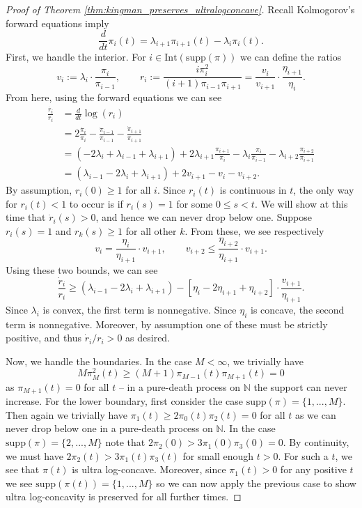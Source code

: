 \documentclass[10pt,oneside,reqno]{article}
\theoremstyle{plain}
\theoremstyle{definition}
\numberwithin{equation}{section}
\renewcommand{\leq}{\leqslant}
\renewcommand{\geq}{\geqslant}
\newcommand{\N}{\mathbb{N}}
\begin{document}
\begin{proof}[Proof of Theorem \ref{thm:kingman_preserves_ultralogconcave}]
     Recall Kolmogorov's forward equations imply
    \[\frac{d}{dt} \pi_i(t) = \lambda_{i+1}\pi_{i+1}(t) - \lambda_i \pi_i(t).\]
    \noindent First, we handle the interior. For $i \in \mathrm{Int}(\mathrm{supp}(\pi))$ we can define the ratios
    \[v_i := \lambda_i \cdot \frac{\pi_i}{\pi_{i-1}}, \qquad r_i := \frac{i\pi_i^2}{(i+1)\pi_{i-1}\pi_{i+1}}  = \frac{v_i}{v_{i+1}} \cdot \frac{\eta_{i+1}}{\eta_i}.\]
    \noindent From here, using the forward equations we can see
    \begin{align*}
        \frac{\dot{r_i}}{r_i} & = \frac{d}{dt} \log(r_i)\\
        & = 2 \frac{\dot{\pi_i}}{\pi_i} - \frac{\dot{\pi}_{i-1}}{\pi_{i-1}} - \frac{\dot{\pi}_{i+1}}{\pi_{i+1}}\\ 
        & = \left(-2\lambda_i + \lambda_{i-1} + \lambda_{i+1}\right) + 2\lambda_{i+1}\frac{\pi_{i+1}}{\pi_i} - \lambda_i\frac{\pi_i}{\pi_{i-1}} - \lambda_{i+2} \frac{\pi_{i+2}}{\pi_{i+1}}\\
        & = \left(\lambda_{i-1} -2\lambda_i + \lambda_{i+1}\right) + 2v_{i+1} - v_i - v_{i+2}.
    \end{align*}
    \noindent By assumption, $r_i(0) \geq 1$ for all $i$. Since $r_i(t)$ is continuous in $t$, the only way for $r_i(t) < 1$ to occur is if $r_i(s) = 1$ for some $0 \leq s < t$. We will show at this time that $\dot{r}_i(s) > 0$, and hence we can never drop below one. Suppose $r_i(s) = 1$ and $r_k(s) \geq 1$ for all other $k$. From these, we see respectively
    \[v_i = \frac{\eta_i}{\eta_{i+1}} \cdot v_{i+1}, \qquad v_{i+2} \leq \frac{\eta_{i+2}}{\eta_{i+1}} \cdot v_{i+1}.\]
    \noindent Using these two bounds, we can see
    \[\frac{\dot{r}_i}{r_i} \geq (\lambda_{i-1} - 2\lambda_i + \lambda_{i+1}) - \left[\eta_{i} - 2\eta_{i+1} + \eta_{i+2}\right] \cdot \frac{v_{i+1}}{\eta_{i+1}}.\]
    \noindent Since $\lambda_i$ is convex, the first term is nonnegative. Since $\eta_i$ is concave, the second term is nonnegative. Moreover, by assumption one of these must be strictly positive, and thus $\dot{r}_i/r_i > 0$ as desired. 
    
    Now, we handle the boundaries. In the case $M < \infty$, we trivially have 
        \[M\pi^2_M(t) \geq (M+1)\pi_{M-1}(t)\pi_{M+1}(t) = 0\] 
    \noindent as $\pi_{M+1}(t) = 0$ for all $t$ -- in a pure-death process on $\N$ the support can never increase. For the lower boundary, first consider the case $\mathrm{supp}(\pi) = \{1,..., M\}$. Then again we trivially have $\pi_1(t) \geq 2\pi_0(t)\pi_2(t) = 0$ for all $t$ as we can never drop below one in a pure-death process on $\N$. In the case $\mathrm{supp}(\pi) = \{2,..., M\}$ note that $2\pi_2(0) > 3\pi_1(0)\pi_3(0) = 0$. By continuity, we must have $2\pi_2(t) > 3\pi_1(t) \pi_3(t)$ for small enough $t > 0$. For such a $t$, we see that $\pi(t)$ is ultra log-concave. Moreover, since $\pi_1(t) > 0$ for any positive $t$ we see $\mathrm{supp}(\pi(t)) = \{1,..., M\}$ so we can now apply the previous case to show ultra log-concavity is preserved for all further times.
\end{proof}
\end{document}
